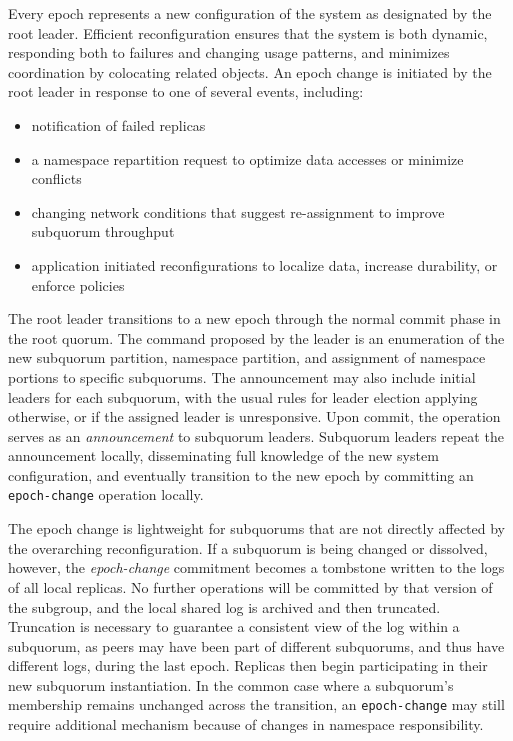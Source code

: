 \documentclass[10pt,conference]{IEEEtran}
\newcommand{\sub}{subquorum\xspace}
\newcommand{\roo}{root quorum\xspace}
\begin{document}
Every epoch represents a new configuration of the system as designated
by the root leader.
Efficient reconfiguration ensures that the system is both dynamic,
responding both to failures and changing usage patterns, and minimizes
coordination by colocating related objects.
An epoch change is initiated by the root leader in response to one of
several events, including:

\begin{itemize}
    \item notification of failed replicas
    \item a namespace repartition request to optimize data accesses or minimize conflicts
    \item changing network conditions that suggest re-assignment to improve \sub throughput
    \item application initiated reconfigurations to localize data, increase durability, or enforce policies
\end{itemize}

The root leader transitions to a new epoch through the normal commit
phase in the \roo.
The command proposed by the leader is an enumeration of the new subquorum
partition, namespace partition, and assignment of namespace portions to
specific subquorums.
The announcement may also include initial leaders for each subquorum,
with the usual rules for leader election applying otherwise, or if the
assigned leader is unresponsive.
Upon commit, the operation serves as an \emph{announcement} to subquorum
leaders.
Subquorum leaders repeat the announcement locally, disseminating full
knowledge of the new system configuration, and eventually transition to
the new epoch by committing an \texttt{epoch-change} operation locally.

The epoch change is lightweight for subquorums that are not directly
affected by the overarching reconfiguration.
If a subquorum is being changed or dissolved, however, the
\emph{epoch-change} commitment becomes a tombstone written to the logs
of all local replicas.
No further operations will be committed by that version of the subgroup,
and the local shared log is archived and then truncated.
Truncation is necessary to guarantee a consistent view of the log within
a subquorum, as peers may have been part of different subquorums, and
thus have different logs, during the last epoch.
Replicas then begin participating in their new subquorum instantiation.
In the common case where a subquorum's membership remains unchanged
across the transition, an \texttt{epoch-change} may still require
additional mechanism because of changes in namespace responsibility.
\end{document}
